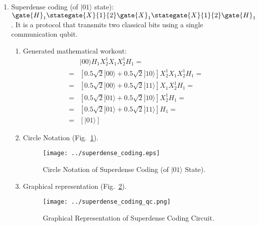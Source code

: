 \documentclass[sigconf,natbib=false]{acmart}
\begin{document}
\begin{enumerate}
\item Superdense coding (of $|01\rangle$ state): $\gate{H}_1 \stategate{X}{1}{2}\gate{X}_1\stategate{X}{1}{2}\gate{H}_1$. It is a protocol that transmits two classical bits using a single communication qubit.
\begin{enumerate}
\item Generated mathematical workout:
\begin{align*}
&|00\rangle H_{1}X_{2}^{1}X_{1}X_{2}^{1}H_{1}=\\
=& [0.5 \sqrt{2} |00\rangle +0.5 \sqrt{2} |10\rangle ]X_{2}^{1}X_{1}X_{2}^{1}H_{1}=\\
=& [0.5 \sqrt{2} |00\rangle +0.5 \sqrt{2} |11\rangle ]X_{1}X_{2}^{1}H_{1}=\\
=& [0.5 \sqrt{2} |01\rangle +0.5 \sqrt{2} |10\rangle ]X_{2}^{1}H_{1}=\\
=& [0.5 \sqrt{2} |01\rangle +0.5 \sqrt{2} |11\rangle ]H_{1}=\\
=& [ |01\rangle ]
\end{align*}
\item Circle Notation (Fig.~\ref{superdense_coding}).
\begin{figure}[!htb]
\centerline{\texttt{[image: ../superdense\_coding.eps]}}
\caption{Circle Notation of Superdense Coding (of $|01\rangle$ State).}
\label{superdense_coding}
\end{figure}
\item Graphical representation (Fig.~\ref{superdense_coding_qc}).
\begin{figure}[!htb]
\centerline{\texttt{[image: ../superdense\_coding\_qc.png]}}
\caption{Graphical Representation of Superdense Coding Circuit.}
\label{superdense_coding_qc}
\end{figure}
\end{enumerate}


\end{enumerate}
\end{document}
